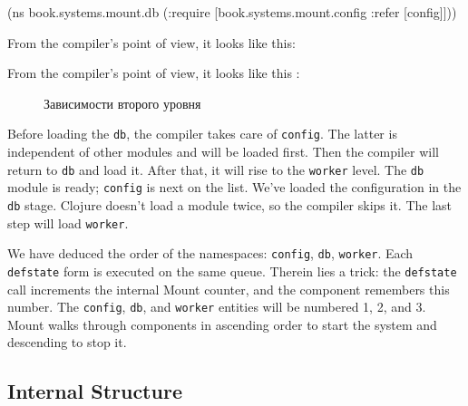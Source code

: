 \else

\begin{english}
  \begin{clojure}
(ns book.systems.mount.db
  (:require
   [book.systems.mount.config :refer [config]]))
  \end{clojure}
\end{english}

\fi

\ifprint

\noindent
From the compiler's point of view, it looks like this:

\begin{figure}[h!]
\end{figure}

\fi

\ifebook

\noindent
From the compiler's point of view, it looks like this :


\begin{figure}[b!]
  \caption{Зависимости второго уровня}
  \label{fig:chart-sys-3}
\end{figure}

\fi

Before loading the \verb|db|, the compiler takes care of \verb|config|. The latter is independent of other modules and will be loaded first. Then the compiler will return to \verb|db| and load it. After that, it will rise to the \verb|worker| level. The \verb|db| module is ready; \verb|config| is next on the list. We've loaded the configuration in the \verb|db| stage. Clojure doesn't load a module twice, so the compiler skips it. The last step will load \verb|worker|.


We have deduced the order of the namespaces: \verb|config|, \verb|db|, \verb|worker|. Each \verb|defstate| form is executed on the same queue. Therein lies a trick: the \verb|defstate| call increments the internal Mount counter, and the component remembers this number. The \verb|config|, \verb|db|, and \verb|worker| entities will be numbered 1, 2, and 3. Mount walks through components in ascending order to start the system and descending to stop it.

\subsection{Internal Structure}

